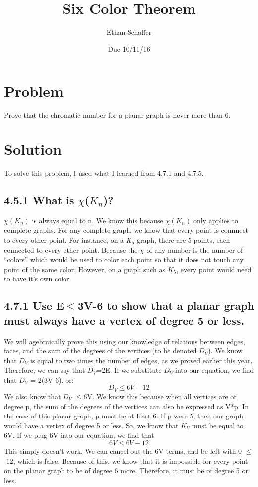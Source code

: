 \documentclass[11pt]{article} %
\title{Six Color Theorem}
\author{Ethan Schaffer}
\date{Due 10/11/16}
\begin{document}
\maketitle

\section{Problem}
Prove that the chromatic number for a planar graph is never more than 6.

\section{Solution}
To solve this problem, I used what I learned from 4.7.1 and 4.7.5. 
\subsection*{ 4.5.1 What is $\chi$($K_n$)?}
$\chi$$(K_n)$  is always equal to n. We know this because $\chi$$(K_n)$ only applies to complete graphs. 
For any complete graph, we know that every point is connnect to every other point. 
For instance, on a $K_5$ graph, there are 5 points, each connected to every other point. 
Because the $\chi$ of any number is the number of ``colors'' which would be used to color each point so that it does not touch any point of the same color.
However, on a graph such as $K_5$, every point would need to have it's own color. 

\subsection*{ 4.7.1 Use E$\leq$3V-6 to show that a planar graph must always have a vertex of degree 5 or less.}
We will agebraically prove this using our knowledge of relations between edges, faces, and the sum of the degrees of the vertices (to be denoted $D_V$).
We know that $D_V$ is equal to two times the number of edges, as we proved earlier this year. 
Therefore, we can say that $D_V$=2E. If we substitute $D_V$ into our equation, we find that $D_V$ = 2(3V-6), or:
\begin{displaymath}D_V \leq 6V-12\end{displaymath}
We also know that $D_V$ $\leq$6V. 
We know this because when all vertices are of degree p, the sum of the degrees of the vertices can also be expressed as V*p.
In the case of this planar graph, p must be at least 6. If p were 5, then our graph would have a vertex of degree 5 or less.
So, we know that $K_V$ must be equal to 6V. If we plug 6V into our equation, we find that  
\begin{displaymath}6V \leq 6V-12\end{displaymath}
This simply doesn't work. We can cancel out the 6V terms, and be left with 0 $\leq$ -12, which is false. 
Because of this, we know that it is impossible for every point on the planar graph to be of degree 6 more. 
Therefore, it must be of degree 5 or less.
\end{document}

